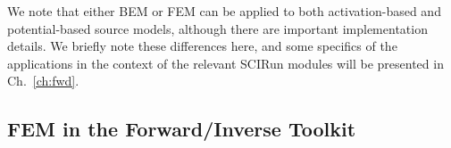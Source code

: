 \documentclass[fleqn,11pt,openany]{book}
\newcommand{\BM }[1]{\mbox{\boldmath $#1$}}
\begin{document}

We note that either BEM or FEM can be applied to both activation-based and
potential-based source models, although there are important implementation
details. We briefly note these differences here, and some specifics of the
applications in the context of the relevant SCIRun modules will be
presented in Ch.~\ref{ch:fwd}.



\subsection{FEM in the Forward/Inverse Toolkit}



\end{document}
